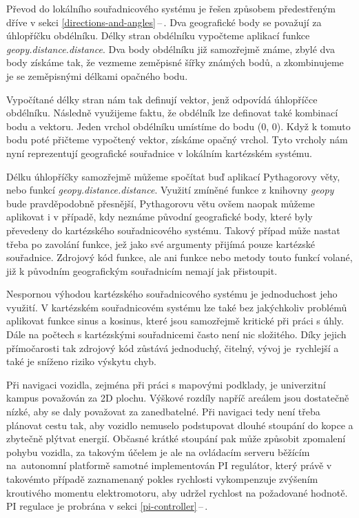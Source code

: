 \documentclass[czech, bachelor]{diploma}
\newcommand{\filipref}[1]{\ref{#1}\,--\,\nameref{#1}}
\begin{document}
Převod do lokálního souřadnicového systému je řešen způsobem předestřeným dříve v sekci \filipref{directions-and-angles}. Dva
geografické body se považují za úhlopříčku obdélníku. Délky stran obdélníku vypočteme aplikací funkce
\emph{geopy.distance.distance}. Dva body obdélníku již samozřejmě známe, zbylé dva body získáme tak, že vezmeme zeměpisné šířky
známých bodů, a zkombinujeme je se zeměpisnými délkami opačného bodu.

Vypočítané délky stran nám tak definují vektor, jenž odpovídá úhlopříčce obdélníku. Následně využijeme faktu, že obdélník lze
definovat také kombinací bodu a vektoru. Jeden vrchol obdélníku umístíme do bodu (0, 0). Když k tomuto bodu poté přičteme
vypočtený vektor, získáme opačný vrchol. Tyto vrcholy nám nyní reprezentují geografické souřadnice v lokálním kartézském systému.

Délku úhlopříčky samozřejmě můžeme spočítat buď aplikací Pythagorovy věty, nebo funkcí \emph{geopy.distance.distance}. Využití
zmíněné funkce z knihovny \emph{geopy} bude pravděpodobně přesnější, Pythagorovu větu ovšem naopak můžeme aplikovat i v případě,
kdy neznáme původní geografické body, které byly převedeny do kartézského souřadnicového systému. Takový případ může nastat třeba
po zavolání funkce, jež jako své argumenty přijímá pouze kartézské souřadnice. Zdrojový kód funkce, ale ani funkce nebo metody
touto funkcí volané, již k původním geografickým souřadnicím nemají jak přistoupit.

Nespornou výhodou kartézského souřadnicového systému je jednoduchost jeho využití. V kartézském souřadnicovém systému lze také
bez jakýchkoliv problémů aplikovat funkce sinus a kosinus, které jsou samozřejmě kritické při práci s úhly. Dále na počtech
s kartézskými souřadnicemi často není nic složitého. Díky jejich přímočarosti tak zdrojový kód zůstává jednoduchý, čitelný,
vývoj je~rychlejší a také je sníženo riziko výskytu chyb.

Při navigaci vozidla, zejména při práci s mapovými podklady, je univerzitní kampus považován za 2D plochu. Výškové rozdíly napříč
areálem jsou dostatečně nízké, aby se daly považovat za zanedbatelné. Při navigaci tedy není třeba plánovat cestu tak, aby vozidlo
nemuselo podstupovat dlouhé stoupání do kopce a zbytečně plýtvat energií. Občasné krátké stoupání pak může způsobit zpomalení
pohybu vozidla, za takovým účelem je ale na ovládacím serveru běžícím na~autonomní platformě samotné implementován PI regulátor,
který právě v takovémto případě zaznamenaný pokles rychlosti vykompenzuje zvýšením kroutivého momentu elektromotoru, aby udržel
rychlost na požadované hodnotě. PI regulace je probrána v sekci \filipref{pi-controller}.
\end{document}
